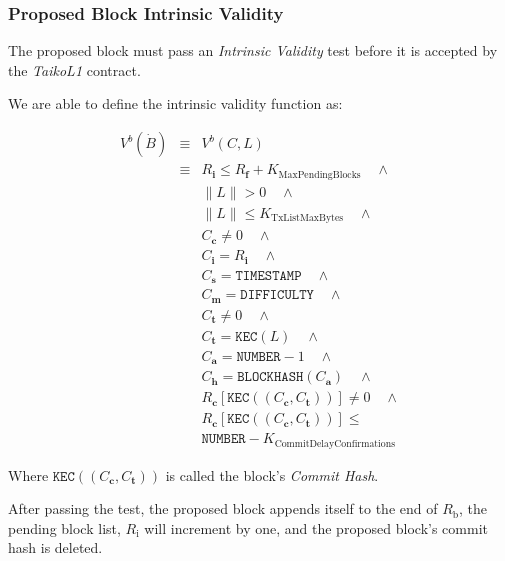 \documentclass[9pt,oneside]{amsart}
\begin{document}
\begin{multicols}{2}
\subsubsection{Proposed Block Intrinsic Validity}
The proposed block must pass an \textit{Intrinsic Validity} test before it is accepted by the \textit{TaikoL1} contract. 

We are able to define the intrinsic validity function as:

\begin{eqnarray}
V^{b}(\dot{B}) & \equiv &   V^{b}(C,L)  \\
\nonumber & \equiv &   R_\mathbf{i} \le R_\mathbf{f} + K_\mathrm{MaxPendingBlocks}   \quad \wedge \\
\nonumber& & \lVert L \rVert > 0 \quad \wedge \\
\nonumber & & \lVert L \rVert \le K_{\mathrm{TxListMaxBytes}} \quad \wedge \\
\nonumber& & C_{\mathbf{c}} \ne 0   \quad \wedge \\
\nonumber& & C_{\mathbf{i}} = R_\mathbf{i}   \quad \wedge \\
\nonumber& & C_{\mathbf{s}} = \texttt{TIMESTAMP}   \quad \wedge \\
\nonumber& & C_{\mathbf{m}} = \texttt{DIFFICULTY}   \quad \wedge \\
\nonumber& & C_{\mathbf{t}} \ne 0   \quad \wedge \\
\nonumber& & C_{\mathbf{t}} = \texttt{KEC}(L)   \quad \wedge \\
\nonumber& & C_{\mathbf{a}} = \texttt{NUMBER} - 1   \quad \wedge \\
\nonumber& & C_{\mathbf{h}} = \texttt{BLOCKHASH}(C_{\mathbf{a}})   \quad \wedge \\
\nonumber& & R_{\mathbf{c}}[\texttt{KEC}((C_{\mathbf{c}}, C_{\mathbf{t}}))] \ne 0  \quad \wedge \\
\nonumber& & R_{\mathbf{c}}[\texttt{KEC}((C_{\mathbf{c}}, C_{\mathbf{t}}))] \le  \\
\nonumber& &  \texttt{NUMBER}   -  K_{\mathrm{CommitDelayConfirmations}}
\end{eqnarray}

Where $\texttt{KEC}((C_{\mathbf{c}}, C_{\mathbf{t}}))$ is called the block's \textit{Commit Hash}.

After passing the test, the proposed block appends itself to the end of $R_\mathrm{b}$, the pending block list, $R_\mathrm{i}$ will increment by one, and the proposed block's commit hash is deleted.



\end{multicols}
\end{document}
